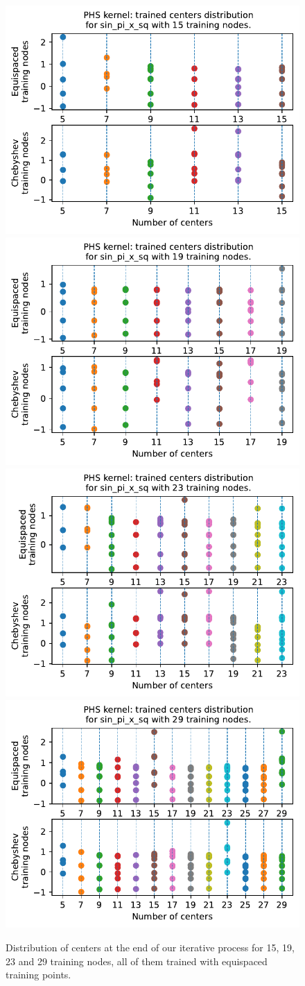 \documentclass[12pt]{report} %
\begin{document}
\begin{figure}[ht]
  \centering
  \includegraphics[width=.45\textwidth, trim={0 4.47cm 0 0}, clip=true]{imagenes/experiments/1d/phs_nodes_asymptotic/sin_pi_x_sq_TR15.pdf}
  \includegraphics[width=.45\textwidth, trim={0 4.47cm 0 0}, clip=true]{imagenes/experiments/1d/phs_nodes_asymptotic/sin_pi_x_sq_TR19.pdf}
  \includegraphics[width=.45\textwidth, trim={0 4.47cm 0 0}, clip=true]{imagenes/experiments/1d/phs_nodes_asymptotic/sin_pi_x_sq_TR23.pdf}
  \includegraphics[width=.45\textwidth, trim={0 4.47cm 0 0}, clip=true]{imagenes/experiments/1d/phs_nodes_asymptotic/sin_pi_x_sq_TR29.pdf}
  \caption{Distribution of centers at the end of our iterative process for 15, 19, 23 and 29 training nodes, all of them trained with equispaced training points.}
  \label{fig:epochs-sin-pi-sq-show}
\end{figure}
\end{document}
